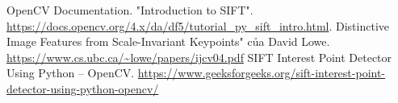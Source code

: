 \newpage
{}
\begin{thebibliography}{80}
     OpenCV Documentation. "Introduction to SIFT".
	\url{https://docs.opencv.org/4.x/da/df5/tutorial_py_sift_intro.html}.
	 Distinctive Image Features from Scale-Invariant Keypoints" của David Lowe. \url{https://www.cs.ubc.ca/~lowe/papers/ijcv04.pdf}
	 SIFT Interest Point Detector Using Python – OpenCV. \url{https://www.geeksforgeeks.org/sift-interest-point-detector-using-python-opencv/}
	
	
\end{thebibliography}